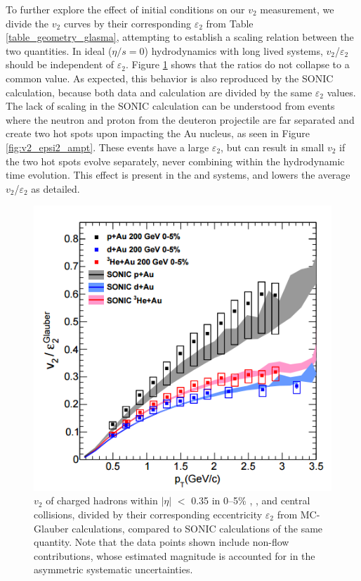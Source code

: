 To further explore the effect of initial conditions on our $v_2$ measurement, we divide the $v_2$ curves by their corresponding $\varepsilon_2$ from Table \ref{table_geometry_glasma}, attempting to establish  a scaling relation between the two quantities. In ideal ($\eta/s=0$) hydrodynamics with long lived systems, $v_2$/$\varepsilon_2$ should be independent of $\varepsilon_2$. Figure \ref{fig:v2_divided_epsilon_all_sys} shows that the ratios do not collapse to a common value. As expected, this behavior is also reproduced by the SONIC calculation, because both data and calculation are divided by the same $\varepsilon_2$ values. The lack of scaling in the SONIC calculation can be understood from \dau events where the neutron and proton from the deuteron projectile are far separated and create two hot spots upon impacting the Au nucleus, as seen in Figure \ref{fig:v2_epsi2_ampt}. These events have a large $\varepsilon_2$, but can result in small $v_2$ if the two hot spots evolve separately, never combining within the hydrodynamic time evolution. This effect is present in the \dau and \hau systems, and lowers the average $v_2$/$\varepsilon_2$ as detailed.%

\begin{figure}[!ht]
\begin{center}
\includegraphics[width=0.65\linewidth]{figs/v2_divided_epsilon_all_sys.PNG}
\caption{$v_2$ of charged hadrons within $|\eta|$ $<$ 0.35 in 0--5\% \pau,  \dau, and \hau central collisions, divided by their corresponding eccentricity $\varepsilon_2$ from MC-Glauber calculations, compared to SONIC calculations of the same quantity. Note that the data points shown include non-flow contributions, whose estimated magnitude is accounted for in the asymmetric systematic uncertainties.}
\label{fig:v2_divided_epsilon_all_sys}
\end{center}
\end{figure}

